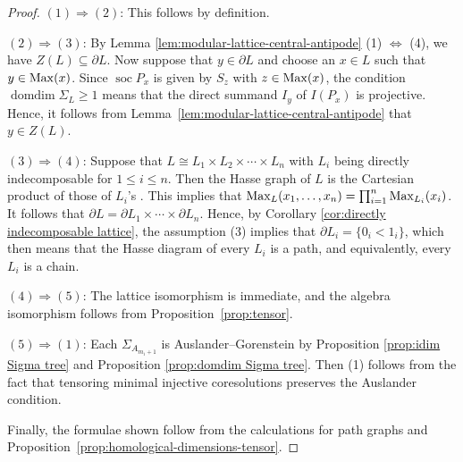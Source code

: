 \documentclass[a4paper,leqno]{amsart}
\begin{document}
\begin{proof}
$(1)\Rightarrow(2)$: This follows by definition. 

$(2)\Rightarrow(3)$:  By Lemma \ref{lem:modular-lattice-central-antipode} (1) $\Leftrightarrow$ (4), we have $Z(L)\subseteq \partial L$.
Now suppose that $y\in\partial L$ and choose an $x\in L$ such that $y\in\operatorname{Max}(x)$. 
Since $\operatorname{soc} P_x$ is given by $S_z$ with $z\in \operatorname{Max}(x)$, the condition $\operatorname{domdim}\Sigma_L\geq1$ means that the direct summand $I_y$ of $I(P_x)$ is projective. 
Hence, it follows from Lemma~\ref{lem:modular-lattice-central-antipode} that $y \in Z(L)$.

$(3)\Rightarrow(4)$:  
Suppose that $L\cong L_1\times L_2\times \cdots\times L_n$ with $L_i$ being directly indecomposable for $1\le i\le n$.  Then the Hasse graph of $L$ is the Cartesian product of those of $L_i$'s .  This implies that 
$\operatorname{Max}_L(x_1,\ldots,x_n)=\prod_{i=1}^n\operatorname{Max}_{L_i}(x_i)$. 
It follows that $\partial L=\partial L_1\times\cdots\times\partial L_n$.
Hence, by Corollary \ref{cor:directly indecomposable lattice}, the assumption (3) implies that $\partial L_i=\{ 0_i < 1_i \}$, which then means that the Hasse diagram of every $L_i$ is a path, and equivalently, every $L_i$ is a chain. 

$(4)\Rightarrow(5)$: The lattice isomorphism is immediate, and the algebra isomorphism follows from Proposition~\ref{prop:tensor}. 

$(5)\Rightarrow(1)$: Each $\Sigma_{A_{m_i+1}}$ is Auslander--Gorenstein by Proposition \ref{prop:idim Sigma tree} and Proposition \ref{prop:domdim Sigma tree}.  Then (1) follows from the fact that tensoring minimal injective coresolutions preserves the Auslander condition.

Finally, the formulae shown follow from the calculations for path graphs and Proposition~\ref{prop:homological-dimensions-tensor}.
\end{proof}
\end{document}
